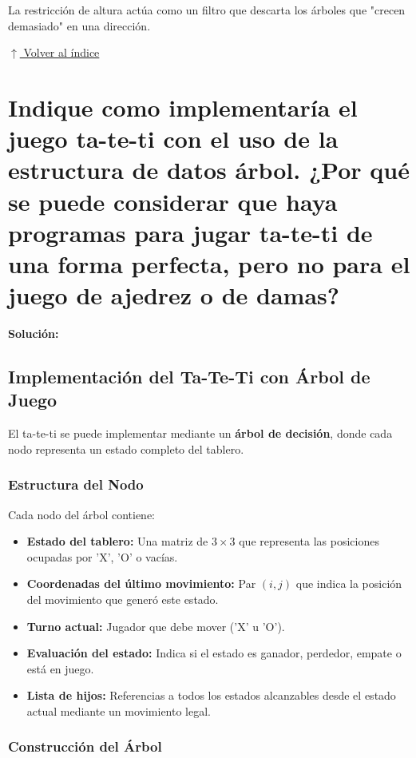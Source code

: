 \documentclass[12pt]{article}
\newcommand{\solucion}{%
    \vspace{0.8em}%
    \textbf{Solución:}%
}
\newcommand{\volverindice}{%
    \vspace{1em}%
    \begin{flushright}%
        \hyperlink{indice}{\small $\uparrow$ Volver al índice}%
    \end{flushright}%
}
\begin{document}
La restricción de altura actúa como un filtro que descarta los árboles que "crecen demasiado" en una dirección.

\volverindice

\newpage
\section{Indique como implementaría el juego ta-te-ti con el uso de la estructura de datos árbol. ¿Por qué se puede considerar que haya programas para jugar ta-te-ti de una forma perfecta, pero no para el juego de ajedrez o de damas?}

\solucion

\subsection*{Implementación del Ta-Te-Ti con Árbol de Juego}

El ta-te-ti se puede implementar mediante un \textbf{árbol de decisión}, donde cada nodo representa un estado completo del tablero.

\subsubsection*{Estructura del Nodo}

Cada nodo del árbol contiene:

\begin{itemize}[leftmargin=2em]
    \item \textbf{Estado del tablero:} Una matriz de $3 \times 3$ que representa las posiciones ocupadas por 'X', 'O' o vacías.
    \item \textbf{Coordenadas del último movimiento:} Par $(i, j)$ que indica la posición del movimiento que generó este estado.
    \item \textbf{Turno actual:} Jugador que debe mover ('X' u 'O').
    \item \textbf{Evaluación del estado:} Indica si el estado es ganador, perdedor, empate o está en juego.
    \item \textbf{Lista de hijos:} Referencias a todos los estados alcanzables desde el estado actual mediante un movimiento legal.
\end{itemize}

\newpage
\subsubsection*{Construcción del Árbol}
\end{document}

